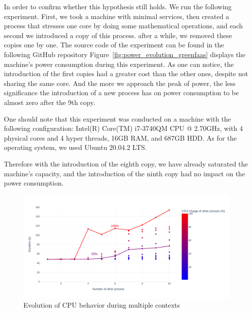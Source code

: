 In order to confirm whether this hypothesis still holds. We run the following experiment\link.
First, we took a machine with minimal services, then created a process that stresses one core by doing some mathematical operations, and each second we introduced a copy of this process. after a while, we removed these copies one by one.
The source code of the experiment can be found in the following GitHub repository
Figure~\ref{fig:power_evolution_greenfaas} displays the machine's power consumption during this experiment. As one can notice, the introduction of the first copies had a greater cost than the other ones, despite not sharing the same core. And the more we approach the peak of power, the less significance the introduction of a new process has on power consumption to be almost zero after the 9th copy.

One should note that this experiment was conducted on a machine with the following configuration:
Intel(R) Core(TM) i7-3740QM CPU @ 2.70GHz, with 4 physical cores and 4 hyper threads, 16GB RAM, and 687GB HDD. As for the operating system, we used Ubuntu 20.04.2 LTS. 

Therefore with the introduction of the eighth copy, we have already saturated the machine's capacity, and the introduction of the ninth copy had no impact on the power consumption.
\begin{figure}[!h]
      \centering
      \includegraphics[width=\linewidth]{chapters/green_faas_duration}
      \caption{Evolution of CPU behavior during multiple contexts }
      \label{fig:green_faas_duration}
\end{figure}

